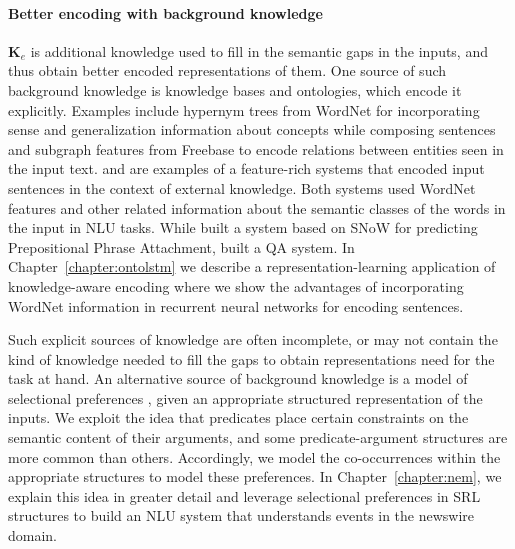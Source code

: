 \paragraph{Better encoding with background knowledge}
$\mathbf{K}_e$ is additional knowledge used to fill in the semantic gaps in the inputs, and thus obtain better
encoded representations of them. One source of such background knowledge is knowledge bases and ontologies, which encode
it explicitly. Examples include hypernym trees from WordNet for incorporating sense and generalization information about
concepts while composing sentences and subgraph features from Freebase to encode relations
between entities seen in the input text. \cite{moldovan2001logic} and \cite{krymolowski1998incorporating} are examples of a feature-rich systems that encoded input sentences in the 
context of external knowledge. Both systems used WordNet features and other related information about the semantic classes of the words in the input in NLU tasks. While \cite{krymolowski1998incorporating} 
built a system based on SNoW \citep{CCRR99} for predicting Prepositional Phrase Attachment, \cite{moldovan2001logic} built a QA system. In Chapter~\ref{chapter:ontolstm} we describe
a representation-learning application of knowledge-aware encoding where we show the advantages of incorporating WordNet information in recurrent neural networks for encoding sentences.

Such explicit sources of knowledge are often incomplete, or may not contain the kind of knowledge needed to fill the gaps to obtain representations need for the task at hand. 
An alternative source of background knowledge is a model of selectional preferences \citep{wilks1973preference}, given an appropriate structured representation of the inputs.
We exploit the idea that predicates place certain constraints on the semantic content of their arguments, and some predicate-argument structures are more common than others.
Accordingly, we model the co-occurrences within the appropriate structures to model these preferences. In Chapter~\ref{chapter:nem}, we explain this idea in greater detail
and leverage selectional preferences in SRL structures to build an NLU system that understands events in the newswire domain.

